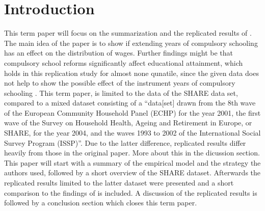\documentclass[12pt,a4paper]{article}
\begin{document}
\begin{adjustwidth}{1.5em}{0pt}

\begin{acronym}[dummyyyy]


\end{acronym}

\end{adjustwidth}

\restoregeometry

\newpage
{}
\section{Introduction}\label{introduction}

This term paper will focus on the summarization and the replicated
results of \textcite{brunello}. The main idea of the paper is to show if
extending years of compulsory schooling has an effect on the
distribution of wages. Further findings might be that compulsory school
reforms significantly affect educational attainment, which holds in this
replication study for almost none qunatile, since the given data does
not help to show the possible effect of the instrument years of
compulsory schooling . This term paper, is limited to the data of the
SHARE data set, compared to a mixed dataset consisting of a
\enquote{data{[}set{]} drawn from the 8th wave of the European Community
Household Panel (ECHP) for the year 2001, the first wave of the Survey
on Household Health, Ageing and Retirement in Europe, or SHARE, for the
year 2004, and the waves 1993 to 2002 of the International Social Survey
Program (ISSP)}\textcite{brunello}. Due to the latter difference,
replicated results differ heavily from those in the original paper. More
about this in the dicussion section. This paper will start with a
summary of the empirical model and the strategy the authors used,
followed by a short overview of the SHARE dataset. Afterwards the
replicated results limited to the latter dataset were presented and a
short comparison to the findings of \textcite{brunello} is included. A
discussion of the replicated results is followed by a conclusion section
which closes this term paper.
\end{document}
